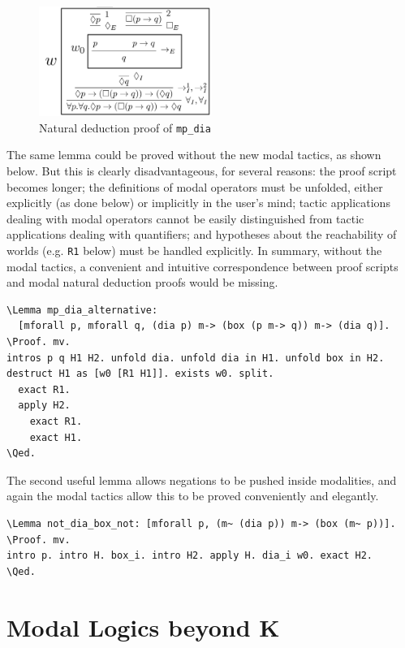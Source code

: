 \documentclass{llncs}
\newcommand{\red}[1]{\textcolor[rgb]{1,0,0}{#1}}
\newcommand{\blue}[1]{\textcolor[rgb]{0,0,1}{#1}}
\newcommand{\Lemma}{\red{Lemma}}
\newcommand{\Proof}{\blue{Proof}}
\newcommand{\Qed}{\blue{Qed}}
\begin{document}
\begin{figure}[H]
\centering
\label{fig:mp_dia}
\includegraphics[width=0.5\textwidth]{ND-(mp_dia).png}
\caption{Natural deduction proof of \texttt{mp\_dia}}
\end{figure}

\noindent
The same lemma could be proved without the new modal tactics, as shown below.
But this is clearly disadvantageous, for several reasons: 
the proof script becomes longer;
the definitions of modal operators must be unfolded, 
either explicitly (as done below) or implicitly in the user's mind; 
tactic applications dealing with modal operators cannot be easily distinguished
from tactic applications dealing with quantifiers; and  
hypotheses about the reachability of worlds (e.g. \texttt{R1} below) 
must be handled explicitly. In summary, without the modal tactics, 
a convenient and intuitive correspondence between proof scripts and 
modal natural deduction proofs would be missing.

\begin{Verbatim}[commandchars=\\\{\},fontsize=\verbsize]
\Lemma mp_dia_alternative: 
  [mforall p, mforall q, (dia p) m-> (box (p m-> q)) m-> (dia q)].
\Proof. mv. 
intros p q H1 H2. unfold dia. unfold dia in H1. unfold box in H2.
destruct H1 as [w0 [R1 H1]]. exists w0. split.
  exact R1.
  apply H2.
    exact R1.
    exact H1.
\Qed.
\end{Verbatim}


\noindent
The second useful lemma allows negations to be pushed inside modalities, 
and again the modal tactics allow this to be proved conveniently and elegantly.

\begin{Verbatim}[commandchars=\\\{\},fontsize=\verbsize]
\Lemma not_dia_box_not: [mforall p, (m~ (dia p)) m-> (box (m~ p))].
\Proof. mv. 
intro p. intro H. box_i. intro H2. apply H. dia_i w0. exact H2. 
\Qed.
\end{Verbatim}


\section{Modal Logics beyond K}
\end{document}
